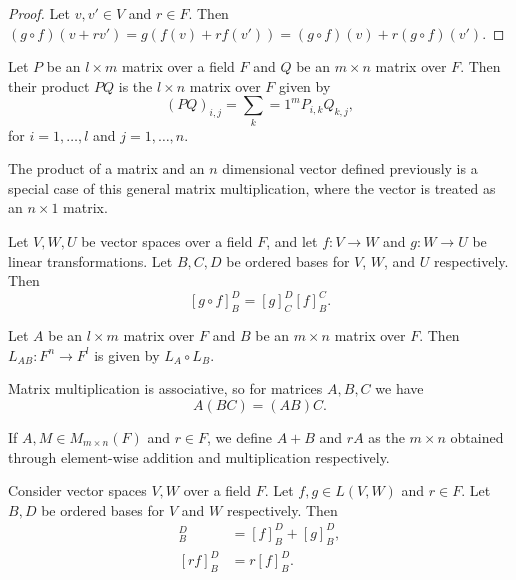 \begin{proof}
    Let $v, v' \in V$ and $r \in F$. Then $(g \circ f)(v + rv') = g(f(v) + rf(v')) = (g \circ f)(v) + r(g \circ f)(v')$.
\end{proof}

\begin{defn}
    Let $P$ be an $l \times m$ matrix over a field $F$ and $Q$ be an $m \times n$ matrix over $F$. Then their product $PQ$ is the $l \times n$ matrix over $F$ given by
    \[(PQ)_{i,j} = \sum_k=1^m P_{i, k}Q_{k, j},\] for $i = 1, \ldots, l$ and $j = 1, \ldots, n$.
\end{defn}

\begin{rmk}
    The product of a matrix and an $n$ dimensional vector defined previously is a special case of this general matrix multiplication, where the vector is treated as an $n \times 1$ matrix.
\end{rmk}

\begin{thm}
    Let $V, W, U$ be vector spaces over a field $F$, and let $f: V \to W$ and $g: W \to U$ be linear transformations. Let $B, C, D$ be ordered bases for $V$, $W$, and $U$ respectively. Then
    \[[g \circ f]_B^D = [g]_C^D[f]_B^C.\]
\end{thm}

\begin{cor}
    Let $A$ be an $l \times m$ matrix over $F$ and $B$ be an $m \times n$ matrix over $F$. Then $L_{AB}: F^n \to F^l$ is given by $L_A \circ L_B$.
\end{cor}

\begin{cor}
    Matrix multiplication is associative, so for matrices $A, B, C$ we have
    \[A(BC) = (AB)C.\]
\end{cor}

\begin{rmk}
    If $A, M \in M_{m\times n}(F)$ and $r \in F$, we define $A + B$ and $rA$ as the $m \times n$ obtained through element-wise addition and multiplication respectively.
\end{rmk}

\begin{thm}
    Consider vector spaces $V, W$ over a field $F$. Let $f, g \in L(V, W)$ and $r \in F$. Let $B, D$ be ordered bases for $V$ and $W$ respectively. Then
    \begin{align*}
        [f + g]_B^D &= [f]_B^D + [g]_B^D, \\
        [rf]_B^D &= r[f]_B^D.
    \end{align*}
\end{thm}

